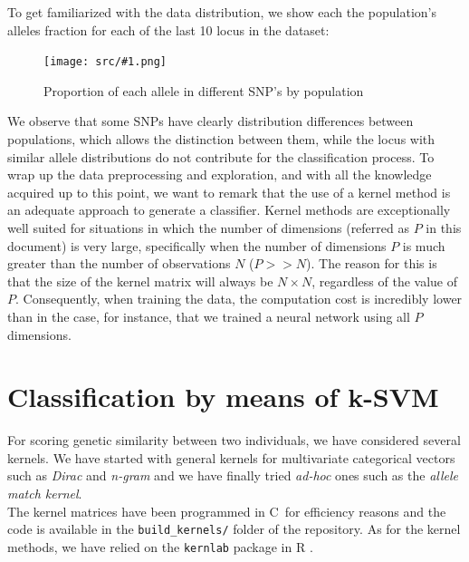 \documentclass[a4paper, 11pt]{article}
\newcommand{\Figure}[3]{
	\begin{figure}[!h]
	\centering
	\texttt{[image: src/\#1.png]}
	\caption{#3}
	\label{fig:#1}
	\end{figure}
}
\theoremstyle{definition}
\theoremstyle{remark}
\def\CC{{C\nolinebreak[4]\hspace{-.05em}\raisebox{.4ex}{\tiny\bf ++}\ }}
\begin{document}
To get familiarized with the data distribution, we show each the population's alleles fraction for each of the last 10 locus in the dataset:

\Figure{allele_distribution}{16}{Proportion of each allele in different SNP's by population}

We observe that some SNPs have clearly distribution differences between populations, which allows the distinction between them, while the locus with similar allele distributions do not contribute for the classification process.
To wrap up the data preprocessing and exploration, and with all the knowledge acquired up to this point, we want to remark that the use of a kernel method is an adequate approach to generate a classifier. Kernel methods are exceptionally well suited for situations in which the number of dimensions (referred as $P$ in this document) is very large, specifically when the number of dimensions $P$ is much greater than the number of observations $N$ ($P >> N$). The reason for this is that the size of the kernel matrix will always be $N \times N$, regardless of the value of $P$. Consequently, when training the data, the computation cost is incredibly lower than in the case, for instance, that we trained a neural network using all $P$ dimensions.





\section{Classification by means of k-SVM}

For scoring genetic similarity between two individuals, we have considered several kernels. We have started with general kernels for multivariate categorical vectors such as \textit{Dirac} and \textit{n-gram} and we have finally tried \textit{ad-hoc} ones such as the \textit{allele match kernel}.\\

The kernel matrices have been programmed in \CC for efficiency reasons and the code is available in the \texttt{build\_kernels/} folder of the repository. As for the kernel methods, we have relied on the \texttt{kernlab} package in R \cite{kernlab}.\\
\end{document}

